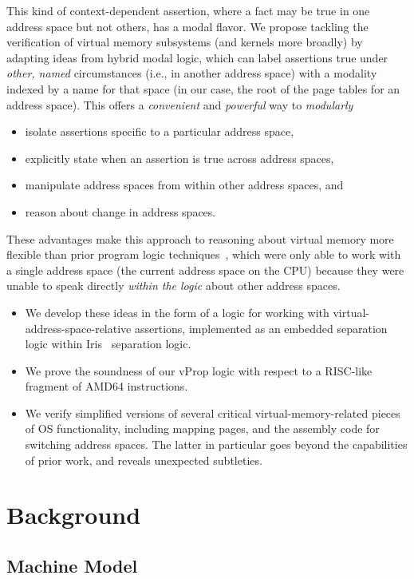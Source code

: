 \documentclass[acmsmall,screen,nonacm]{acmart}
\begin{document}
This kind of context-dependent assertion, where a fact may be true in one address space but not others, has a modal flavor. 
We propose tackling the verification of virtual memory subsystems (and kernels more broadly) by adapting ideas from hybrid
modal logic, which can label assertions true under \emph{other, named} circumstances (i.e., in another address space) with a 
modality indexed by a name for that space (in our case, the root of the page tables for an address space). This offers a 
\textit{convenient} and \textit{powerful} way to \emph{modularly}
\begin{itemize}
\item isolate assertions specific to a particular address space,
\item explicitly state when an assertion is true across address spaces,
\item manipulate address spaces from within other address spaces, and
\item reason about change in address spaces.
\end{itemize}
These advantages make this approach to reasoning about virtual memory more flexible than prior program logic techniques~\cite{kolanski08vstte,kolanski09tphols}, 
which were only able to work with a single address space (the current address space on the CPU) because they were unable
to speak directly \emph{within the logic} about other address spaces.
%
%
%
%
%
%

\begin{itemize}
\item We develop these ideas in the form of a logic for working with virtual-address-space-relative assertions,
      implemented as an embedded separation logic within Iris~\cite{jung2018iris} separation logic.
\item We prove the soundness of our \textsf{vProp} logic with respect to a RISC-like fragment of \textsf{AMD64} instructions.
\item We verify simplified versions of several critical virtual-memory-related pieces of OS functionality, 
      including mapping  pages, and the assembly code for switching address spaces. 
      The latter in particular goes beyond the capabilities of prior work, and reveals unexpected
	subtleties.
\end{itemize}
%
\section{Background}
\label{sec:background}
\subsection{Machine Model}
\label{sec:backgroundonmachinemodel}
\end{document}
